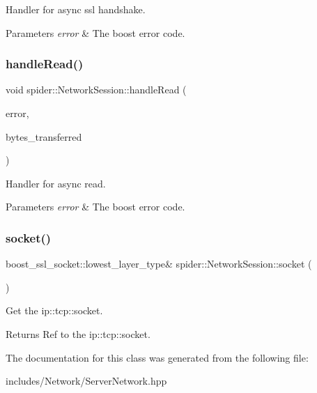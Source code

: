 Handler for async ssl handshake. 


\begin{DoxyParams}{Parameters}
{\em error} & The boost error code. \\
\hline
\end{DoxyParams}
\mbox{\label{classspider_1_1_network_session_a440bcc8bd0a5403a1b98dcd84ceb8aa3}} 
\subsubsection{handle\+Read()}
{\footnotesize\ttfamily void spider\+::\+Network\+Session\+::handle\+Read (\begin{DoxyParamCaption}\item[{boost\+::system\+::error\+\_\+code const \&}]{error,  }\item[{std\+::size\+\_\+t}]{bytes\+\_\+transferred }\end{DoxyParamCaption})}



Handler for async read. 


\begin{DoxyParams}{Parameters}
{\em error} & The boost error code. \\
\hline
\end{DoxyParams}
\mbox{\label{classspider_1_1_network_session_a3a45370fb7c131566c903c3a23366a9f}} 
\subsubsection{socket()}
{\footnotesize\ttfamily boost\+\_\+ssl\+\_\+socket\+::lowest\+\_\+layer\+\_\+type\& spider\+::\+Network\+Session\+::socket (\begin{DoxyParamCaption}{ }\end{DoxyParamCaption})}



Get the ip\+::tcp\+::socket. 

\begin{DoxyReturn}{Returns}
Ref to the ip\+::tcp\+::socket. 
\end{DoxyReturn}


The documentation for this class was generated from the following file\+:\begin{DoxyCompactItemize}
\item 
includes/\+Network/Server\+Network.\+hpp\end{DoxyCompactItemize}
